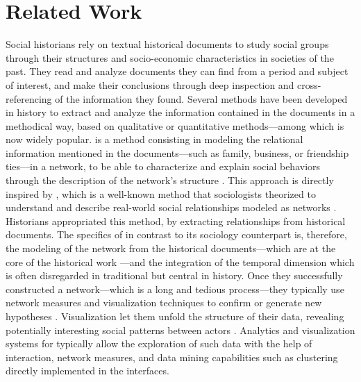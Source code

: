 
\chapter{Related Work}\label{ch:related-work}
\minitoc

Social historians rely on textual historical documents to study social groups through their structures and socio-economic characteristics in societies of the past\cite{tilly1984retrieving, burkeHistorySocialTheory2005}.
They read and analyze documents they can find from a period and subject of interest, and make their conclusions through deep inspection and cross-referencing of the information they found.
Several methods have been developed in history to extract and analyze the information contained in the documents in a methodical way\cite{tillyObservationsSocialProcesses2004}, based on qualitative or quantitative methods---among which \hsna is now widely popular\cite{rollingerProlegomenaProblemsPerspectives2020}.
\hsna is a method consisting in modeling the relational information mentioned in the documents---such as family, business, or friendship ties---in a network, to be able to characterize and explain social behaviors through the description of the network's structure \cite{wetherellHistoricalSocialNetwork1998, kerschbaumerPowerNetworksProspects2015}.
This approach is directly inspired by \sna, which is a well-known method that sociologists theorized to understand and describe real-world social relationships modeled as networks \cite{freemanDevelopmentSocialNetwork2004, scottSocialNetworkAnalysis1988}.
Historians appropriated this method, by extracting relationships from historical documents.
The specifics of \hsna in contrast to its sociology counterpart is, therefore, the modeling of the network from the historical documents---which are at the core of the historical work \cite{prost2014}---and the integration of the temporal dimension which is often disregarded in traditional \sna but central in history.
Once they successfully constructed a network---which is a long and tedious process---they typically use network measures and visualization techniques to confirm or generate new hypotheses \cite{lemercier12FormalNetwork2015}.
Visualization let them unfold the structure of their data, revealing potentially interesting social patterns between actors .
Analytics and visualization systems for \sna typically allow the exploration of such data with the help of interaction, network measures, and data mining capabilities such as clustering directly implemented in the interfaces.
